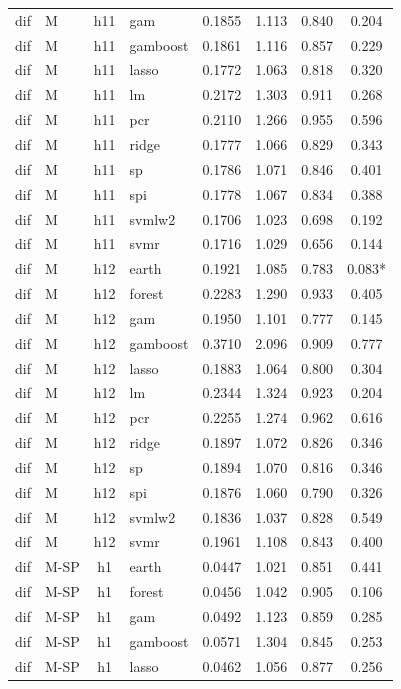 \begin{ThreePartTable}
\begin{longtable}[t]{llclcccc}
dif & M & h11 & gam & 0.1855 & 1.113 & 0.840 & 0.204\\
dif & M & h11 & gamboost & 0.1861 & 1.116 & 0.857 & 0.229\\
dif & M & h11 & lasso & 0.1772 & 1.063 & 0.818 & 0.320\\
dif & M & h11 & lm & 0.2172 & 1.303 & 0.911 & 0.268\\
dif & M & h11 & pcr & 0.2110 & 1.266 & 0.955 & 0.596\\
dif & M & h11 & ridge & 0.1777 & 1.066 & 0.829 & 0.343\\
dif & M & h11 & sp & 0.1786 & 1.071 & 0.846 & 0.401\\
dif & M & h11 & spi & 0.1778 & 1.067 & 0.834 & 0.388\\
dif & M & h11 & svmlw2 & 0.1706 & 1.023 & 0.698 & 0.192\\
dif & M & h11 & svmr & 0.1716 & 1.029 & 0.656 & 0.144\\
\addlinespace
dif & M & h12 & earth & 0.1921 & 1.085 & 0.783 & 0.083*\\
dif & M & h12 & forest & 0.2283 & 1.290 & 0.933 & 0.405\\
dif & M & h12 & gam & 0.1950 & 1.101 & 0.777 & 0.145\\
dif & M & h12 & gamboost & 0.3710 & 2.096 & 0.909 & 0.777\\
dif & M & h12 & lasso & 0.1883 & 1.064 & 0.800 & 0.304\\
dif & M & h12 & lm & 0.2344 & 1.324 & 0.923 & 0.204\\
dif & M & h12 & pcr & 0.2255 & 1.274 & 0.962 & 0.616\\
dif & M & h12 & ridge & 0.1897 & 1.072 & 0.826 & 0.346\\
dif & M & h12 & sp & 0.1894 & 1.070 & 0.816 & 0.346\\
dif & M & h12 & spi & 0.1876 & 1.060 & 0.790 & 0.326\\
dif & M & h12 & svmlw2 & 0.1836 & 1.037 & 0.828 & 0.549\\
dif & M & h12 & svmr & 0.1961 & 1.108 & 0.843 & 0.400\\
\addlinespace
dif & M-SP & h1 & earth & 0.0447 & 1.021 & 0.851 & 0.441\\
dif & M-SP & h1 & forest & 0.0456 & 1.042 & 0.905 & 0.106\\
dif & M-SP & h1 & gam & 0.0492 & 1.123 & 0.859 & 0.285\\
dif & M-SP & h1 & gamboost & 0.0571 & 1.304 & 0.845 & 0.253\\
dif & M-SP & h1 & lasso & 0.0462 & 1.056 & 0.877 & 0.256\\

\end{longtable}
\end{ThreePartTable}
